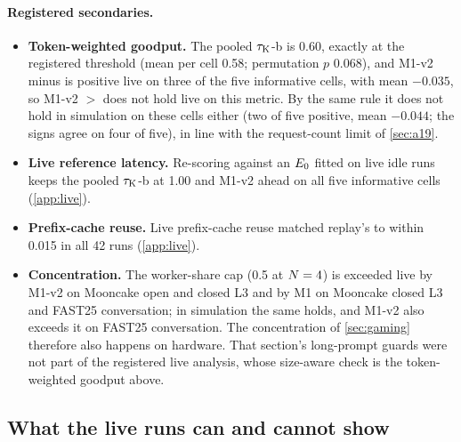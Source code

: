 \paragraph{Registered secondaries.}
\begin{itemize}
  \item \textbf{Token-weighted goodput.} The pooled $\tau_{\mathrm{K}}$-b is 0.60, exactly at the registered
    threshold (mean per cell 0.58; permutation $p$ 0.068), and M1-v2 minus  is
    positive live on three of the five informative cells, with mean $-0.035$, so M1-v2 $>$
     does not hold live on this metric. By the same rule it does not hold in
    simulation on these cells either (two of five positive, mean $-0.044$; the signs agree on four of
    five), in line with the request-count limit of \cref{sec:a19}.
  \item \textbf{Live reference latency.} Re-scoring against an $E_0$ fitted on live idle runs
    keeps the pooled $\tau_{\mathrm{K}}$-b at 1.00 and M1-v2 ahead on all five informative cells
    (\cref{app:live}).
  \item \textbf{Prefix-cache reuse.} Live prefix-cache reuse matched replay's to within 0.015 in all
    42 runs (\cref{app:live}).
  \item \textbf{Concentration.} The worker-share cap (0.5 at $N = 4$) is exceeded live by M1-v2 on
    Mooncake open and closed L3 and by M1 on Mooncake closed L3 and FAST25 conversation; in
    simulation the same holds, and M1-v2 also exceeds it on FAST25 conversation. The concentration
    of \cref{sec:gaming} therefore also happens on hardware. That section's long-prompt guards were
    not part of the registered live analysis, whose size-aware check is the token-weighted goodput
    above.
\end{itemize}

\subsection{What the live runs can and cannot show}
\label{sec:live-limits}

